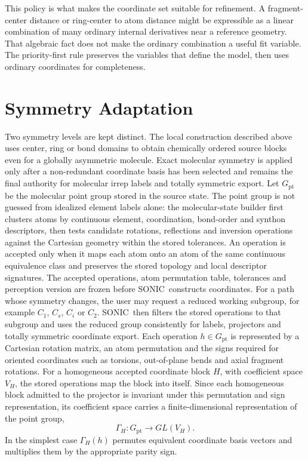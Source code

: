 \documentclass[journal=jctcce,manuscript=article,layout=traditional]{achemso}
\newcommand{\SONIC}{SONIC}
\theoremstyle{definition}
\begin{document}
This policy is what makes the coordinate set suitable for refinement.  A
fragment-center distance or ring-center to atom distance might be expressible as
a linear combination of many ordinary internal derivatives near a reference
geometry.  That algebraic fact does not make the ordinary combination a useful
fit variable.  The priority-first rule preserves the variables that define the
model, then uses ordinary coordinates for completeness.

\section{Symmetry Adaptation}

Two symmetry levels are kept distinct.  The local construction described above
uses center, ring or bond domains to obtain chemically ordered source blocks
even for a globally asymmetric molecule.  Exact molecular symmetry is applied
only after a non-redundant coordinate basis has been selected and remains the
final authority for molecular irrep labels and totally symmetric export.  Let
\(G_{\mathrm{pt}}\) be the molecular point group stored in the
source state.  The point group is not guessed from idealized element labels
alone: the molecular-state builder first clusters atoms by continuous element,
coordination, bond-order and synthon descriptors, then tests candidate
rotations, reflections and inversion operations against the Cartesian geometry
within the stored tolerances.  An operation is accepted only when it maps each
atom onto an atom of the same continuous equivalence class and preserves the
stored topology and local descriptor signatures.  The accepted operations, atom
permutation table, tolerances and perception version are frozen before
\SONIC\ constructs coordinates.  For a path whose symmetry changes, the user
may request a reduced working subgroup, for example \(C_1\), \(C_s\), \(C_i\)
or \(C_2\).  \SONIC\ then filters the stored operations to that subgroup and
uses the reduced group consistently for labels, projectors and totally
symmetric coordinate export.  Each operation \(h\in G_{\mathrm{pt}}\) is represented by a
Cartesian rotation matrix, an atom permutation and the signs required for
oriented coordinates such as torsions, out-of-plane bends and axial fragment
rotations.  For a homogeneous accepted coordinate block \(H\), with coefficient
space \(V_H\), the stored operations map the block into itself.  Since each
homogeneous block admitted to the projector is invariant under this permutation
and sign representation, its coefficient space carries a finite-dimensional
representation of the point group,
\[
  \Gamma_H:G_{\mathrm{pt}}\rightarrow GL(V_H).
\]
In the simplest case \(\Gamma_H(h)\) permutes equivalent coordinate basis
vectors and multiplies them by the appropriate parity sign.
\end{document}
